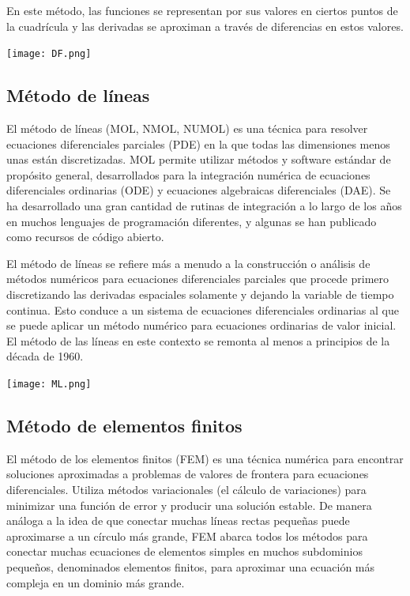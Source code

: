 \documentclass[12pt]{article}
\begin{document}
    En este método, las funciones se representan por sus valores en ciertos puntos de la cuadrícula y las derivadas se aproximan a través de diferencias en estos valores.
    
     \begin{center}
         \texttt{[image: DF.png]}
     \end{center}
    
    \subsection{Método de líneas}
    
    El método de líneas (MOL, NMOL, NUMOL) es una técnica para resolver ecuaciones diferenciales parciales (PDE) en la que todas las dimensiones menos unas están discretizadas. MOL permite utilizar métodos y software estándar de propósito general, desarrollados para la integración numérica de ecuaciones diferenciales ordinarias (ODE) y ecuaciones algebraicas diferenciales (DAE). Se ha desarrollado una gran cantidad de rutinas de integración a lo largo de los años en muchos lenguajes de programación diferentes, y algunas se han publicado como recursos de código abierto.

El método de líneas se refiere más a menudo a la construcción o análisis de métodos numéricos para ecuaciones diferenciales parciales que procede primero discretizando las derivadas espaciales solamente y dejando la variable de tiempo continua. Esto conduce a un sistema de ecuaciones diferenciales ordinarias al que se puede aplicar un método numérico para ecuaciones ordinarias de valor inicial. El método de las líneas en este contexto se remonta al menos a principios de la década de 1960.

     \begin{center}
         \texttt{[image: ML.png]}
     \end{center}


   \subsection{Método de elementos finitos}
   
   El método de los elementos finitos (FEM) es una técnica numérica para encontrar soluciones aproximadas a problemas de valores de frontera para ecuaciones diferenciales. Utiliza métodos variacionales (el cálculo de variaciones) para minimizar una función de error y producir una solución estable. De manera análoga a la idea de que conectar muchas líneas rectas pequeñas puede aproximarse a un círculo más grande, FEM abarca todos los métodos para conectar muchas ecuaciones de elementos simples en muchos subdominios pequeños, denominados elementos finitos, para aproximar una ecuación más compleja en un dominio más grande.
   
\end{document}
